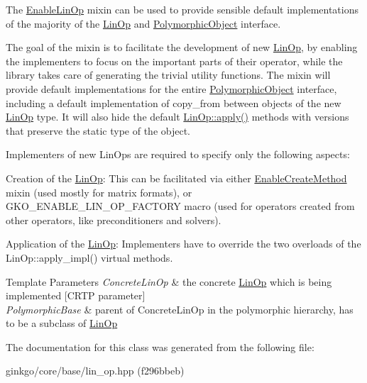 The \hyperlink{classgko_1_1EnableLinOp}{Enable\+Lin\+Op} mixin can be used to provide sensible default implementations of the majority of the \hyperlink{classgko_1_1LinOp}{Lin\+Op} and \hyperlink{classgko_1_1PolymorphicObject}{Polymorphic\+Object} interface. 

The goal of the mixin is to facilitate the development of new \hyperlink{classgko_1_1LinOp}{Lin\+Op}, by enabling the implementers to focus on the important parts of their operator, while the library takes care of generating the trivial utility functions. The mixin will provide default implementations for the entire \hyperlink{classgko_1_1PolymorphicObject}{Polymorphic\+Object} interface, including a default implementation of {\ttfamily copy\+\_\+from} between objects of the new \hyperlink{classgko_1_1LinOp}{Lin\+Op} type. It will also hide the default \hyperlink{classgko_1_1LinOp_a0449b2fc705d2f970855af23b5e2788e}{Lin\+Op\+::apply()} methods with versions that preserve the static type of the object.

Implementers of new Lin\+Ops are required to specify only the following aspects\+:


\begin{DoxyEnumerate}
\item Creation of the \hyperlink{classgko_1_1LinOp}{Lin\+Op}\+: This can be facilitated via either \hyperlink{classgko_1_1EnableCreateMethod}{Enable\+Create\+Method} mixin (used mostly for matrix formats), or G\+K\+O\+\_\+\+E\+N\+A\+B\+L\+E\+\_\+\+L\+I\+N\+\_\+\+O\+P\+\_\+\+F\+A\+C\+T\+O\+RY macro (used for operators created from other operators, like preconditioners and solvers).
\item Application of the \hyperlink{classgko_1_1LinOp}{Lin\+Op}\+: Implementers have to override the two overloads of the Lin\+Op\+::apply\+\_\+impl() virtual methods.
\end{DoxyEnumerate}


\begin{DoxyTemplParams}{Template Parameters}
{\em Concrete\+Lin\+Op} & the concrete \hyperlink{classgko_1_1LinOp}{Lin\+Op} which is being implemented \mbox{[}C\+R\+TP parameter\mbox{]} \\
\hline
{\em Polymorphic\+Base} & parent of Concrete\+Lin\+Op in the polymorphic hierarchy, has to be a subclass of \hyperlink{classgko_1_1LinOp}{Lin\+Op} \\
\hline
\end{DoxyTemplParams}


The documentation for this class was generated from the following file\+:\begin{DoxyCompactItemize}
\item 
ginkgo/core/base/lin\+\_\+op.\+hpp (f296bbeb)\end{DoxyCompactItemize}

